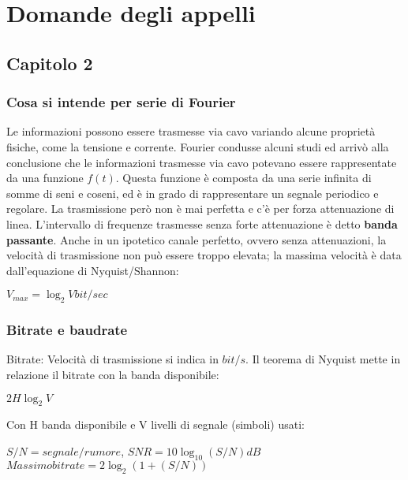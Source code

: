 \section{Domande degli appelli}

\subsection{Capitolo 2}

\subsubsection{Cosa si intende per serie di Fourier}

Le informazioni possono essere trasmesse via cavo variando alcune proprietà fisiche, come la
tensione e corrente. Fourier condusse alcuni studi ed arrivò alla conclusione che le informazioni
trasmesse via cavo potevano essere rappresentate da una funzione $f(t)$. Questa funzione è
composta da una serie infinita di somme di seni e coseni, ed è in grado di rappresentare un segnale
periodico e regolare. La trasmissione però non è mai perfetta e c'è per forza attenuazione di linea.
L'intervallo di frequenze trasmesse senza forte attenuazione è detto \textbf{banda passante}.
Anche in un ipotetico canale perfetto, ovvero senza attenuazioni, la velocità di trasmissione non
può essere troppo elevata; la massima velocità è data dall'equazione di Nyquist/Shannon:

\begin{center}

$V_{max} = \log_{2} V  bit/sec$

\end{center}

\subsubsection{Bitrate e baudrate}

Bitrate: Velocità di trasmissione si indica in $bit/s$. Il teorema di Nyquist mette in relazione il bitrate con la banda disponibile:

\begin{center}

	$2H\log_2V$

\end{center}

Con H banda disponibile e V livelli di segnale (simboli) usati:

\begin{center}

	$S/N = segnale/rumore$,  $SNR = 10\log_{10} (S/N) dB$
	\newline
	$Massimo bitrate = 2\log_2 (1+(S/N))$

\end{center}	

